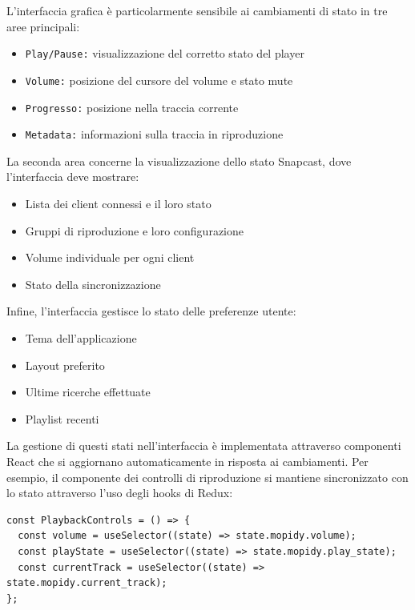 L'interfaccia grafica è particolarmente sensibile ai cambiamenti di stato in tre aree principali:

\begin{itemize}
    \item \texttt{Play/Pause:} visualizzazione del corretto stato del player
    \item \texttt{Volume:} posizione del cursore del volume e stato mute
    \item \texttt{Progresso:} posizione nella traccia corrente
    \item \texttt{Metadata:} informazioni sulla traccia in riproduzione
\end{itemize}

La seconda area concerne la visualizzazione dello stato Snapcast, dove l'interfaccia deve mostrare:

\begin{itemize}
    \item Lista dei client connessi e il loro stato
    \item Gruppi di riproduzione e loro configurazione
    \item Volume individuale per ogni client
    \item Stato della sincronizzazione
\end{itemize}

Infine, l'interfaccia gestisce lo stato delle preferenze utente:

\begin{itemize}
    \item Tema dell'applicazione
    \item Layout preferito
    \item Ultime ricerche effettuate
    \item Playlist recenti
\end{itemize}

\newpage
La gestione di questi stati nell'interfaccia è implementata attraverso componenti React che si aggiornano automaticamente in risposta ai cambiamenti. Per esempio, il componente dei controlli di riproduzione si mantiene sincronizzato con lo stato attraverso l'uso degli hooks di Redux:

\begin{table}[H]
  \begin{algorithm}[H]
    \caption{}
    \BlankLine
  \begin{verbatim}
const PlaybackControls = () => {
  const volume = useSelector((state) => state.mopidy.volume);
  const playState = useSelector((state) => state.mopidy.play_state);
  const currentTrack = useSelector((state) => state.mopidy.current_track);
};
      \end{verbatim}
    \end{algorithm}
    \caption{}
    \label{tab:playbackcontrols}
  \end{table}

